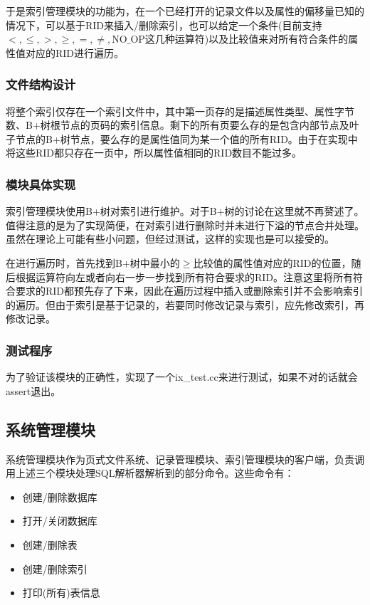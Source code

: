 \documentclass[11pt,UTF8]{report}
\begin{document}
于是索引管理模块的功能为，在一个已经打开的记录文件以及属性的偏移量已知的情况下，可以基于RID来插入/删除索引，也可以给定一个条件(目前支持$<,\le,>,\ge,=,\neq,\text{NO\_OP}$这几种运算符)以及比较值来对所有符合条件的属性值对应的RID进行遍历。

\subsubsection{文件结构设计}

将整个索引仅存在一个索引文件中，其中第一页存的是描述属性类型、属性字节数、B+树根节点的页码的索引信息。剩下的所有页要么存的是包含内部节点及叶子节点的B+树节点，要么存的是属性值同为某一个值的所有RID。由于在实现中将这些RID都只存在一页中，所以属性值相同的RID数目不能过多。
\subsubsection{模块具体实现}

索引管理模块使用B+树对索引进行维护。对于B+树的讨论在这里就不再赘述了。值得注意的是为了实现简便，在对索引进行删除时并未进行下溢的节点合并处理。虽然在理论上可能有些小问题，但经过测试，这样的实现也是可以接受的。

在进行遍历时，首先找到B+树中最小的$\geq$比较值的属性值对应的RID的位置，随后根据运算符向左或者向右一步一步找到所有符合要求的RID。注意这里将所有符合要求的RID都预先存了下来，因此在遍历过程中插入或删除索引并不会影响索引的遍历。但由于索引是基于记录的，若要同时修改记录与索引，应先修改索引，再修改记录。

\subsubsection{测试程序}

为了验证该模块的正确性，实现了一个ix\_test.cc来进行测试，如果不对的话就会assert退出。
\subsection{系统管理模块}

系统管理模块作为页式文件系统、记录管理模块、索引管理模块的客户端，负责调用上述三个模块处理SQL解析器解析到的部分命令。这些命令有：

\begin{itemize}
	\item 创建/删除数据库
	\item 打开/关闭数据库
	\item 创建/删除表
	\item 创建/删除索引
	\item 打印(所有)表信息
\end{itemize}
\end{document}
